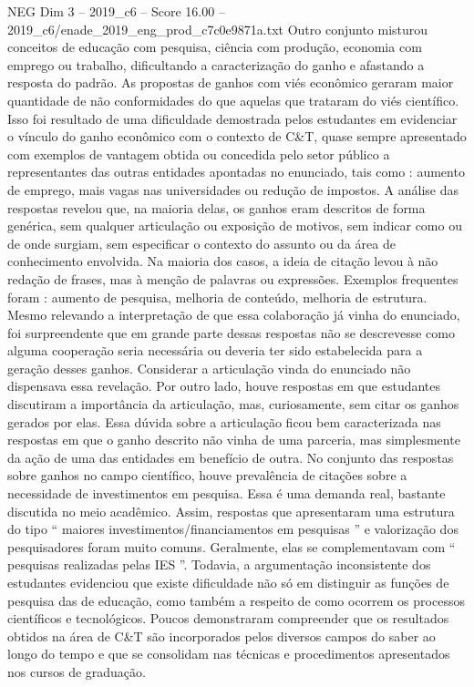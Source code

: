 \begin{textsample}{NEG Dim 3 – 2019\_c6 – Score 16.00 – 2019\_c6/enade\_2019\_eng\_prod\_c7c0e9871a.txt}
Outro conjunto misturou conceitos de educação com pesquisa, ciência com produção, economia com emprego ou trabalho, dificultando a caracterização do ganho e afastando a resposta do padrão.
As propostas de ganhos com viés econômico geraram maior quantidade de não conformidades do que aquelas que trataram do viés científico.
Isso foi resultado de uma dificuldade demostrada pelos estudantes em evidenciar o vínculo do ganho econômico com o contexto de C\&T, quase sempre apresentado com exemplos de vantagem obtida ou concedida pelo setor público a representantes das outras entidades apontadas no enunciado, tais como : aumento de emprego, mais vagas nas universidades ou redução de impostos.
A análise das respostas revelou que, na maioria delas, os ganhos eram descritos de forma genérica, sem qualquer articulação ou exposição de motivos, sem indicar como ou de onde surgiam, sem especificar o contexto do assunto ou da área de conhecimento envolvida.
Na maioria dos casos, a ideia de citação levou à não redação de frases, mas à menção de palavras ou expressões.
Exemplos frequentes foram : aumento de pesquisa, melhoria de conteúdo, melhoria de estrutura.
Mesmo relevando a interpretação de que essa colaboração já vinha do enunciado, foi surpreendente que em grande parte dessas respostas não se descrevesse como alguma cooperação seria necessária ou deveria ter sido estabelecida para a geração desses ganhos.
Considerar a articulação vinda do enunciado não dispensava essa revelação.
Por outro lado, houve respostas em que estudantes discutiram a importância da articulação, mas, curiosamente, sem citar os ganhos gerados por elas.
Essa dúvida sobre a articulação ficou bem caracterizada nas respostas em que o ganho descrito não vinha de uma parceria, mas simplesmente da ação de uma das entidades em benefício de outra.
No conjunto das respostas sobre ganhos no campo científico, houve prevalência de citações sobre a necessidade de investimentos em pesquisa.
Essa é uma demanda real, bastante discutida no meio acadêmico.
Assim, respostas que apresentaram uma estrutura do tipo “ maiores investimentos/financiamentos em pesquisas ” e valorização dos pesquisadores foram muito comuns.
Geralmente, elas se complementavam com “ pesquisas realizadas pelas IES ”.
Todavia, a argumentação inconsistente dos estudantes evidenciou que existe dificuldade não só em distinguir as funções de pesquisa das de educação, como também a respeito de como ocorrem os processos científicos e tecnológicos.
Poucos demonstraram compreender que os resultados obtidos na área de C\&T são incorporados pelos diversos campos do saber ao longo do tempo e que se consolidam nas técnicas e procedimentos apresentados nos cursos de graduação.

\end{textsample}
